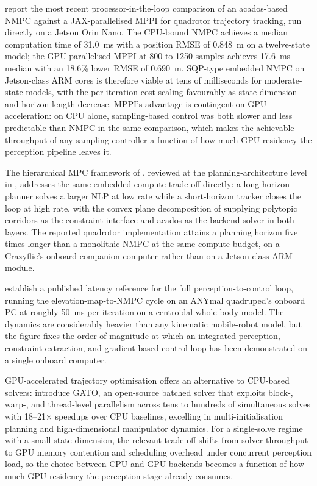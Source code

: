 \documentclass[11pt,a4paper]{article}
\begin{document}
\citet{enrico2025nmpcmppi} report the most recent processor-in-the-loop comparison of an acados-based NMPC against a JAX-parallelised MPPI for quadrotor trajectory tracking, run directly on a Jetson Orin Nano. The CPU-bound NMPC achieves a median computation time of \SI{31.0}{\milli\second} with a position RMSE of \SI{0.848}{\metre} on a twelve-state model; the GPU-parallelised MPPI at 800 to 1250 samples achieves \SI{17.6}{\milli\second} median with an 18.6\% lower RMSE of \SI{0.690}{\metre}. SQP-type embedded NMPC on Jetson-class ARM cores is therefore viable at tens of milliseconds for moderate-state models, with the per-iteration cost scaling favourably as state dimension and horizon length decrease. MPPI's advantage is contingent on GPU acceleration: on CPU alone, sampling-based control was both slower and less predictable than NMPC in the same comparison, which makes the achievable throughput of any sampling controller a function of how much GPU residency the perception pipeline leaves it.

The hierarchical MPC framework of \citet{bendersEmbeddedHierarchicalMPC2025}, reviewed at the planning-architecture level in , addresses the same embedded compute trade-off directly: a long-horizon planner solves a larger NLP at low rate while a short-horizon tracker closes the loop at high rate, with the convex plane decomposition of \citet{liu2017sfc} supplying polytopic corridors as the constraint interface and acados as the backend solver in both layers. The reported quadrotor implementation attains a planning horizon five times longer than a monolithic NMPC at the same compute budget, on a Crazyflie's onboard companion computer rather than on a Jetson-class ARM module.

\citet{grandiaPerceptiveLocomotionNonlinear2022} establish a published latency reference for the full perception-to-control loop, running the elevation-map-to-NMPC cycle on an ANYmal quadruped's onboard PC at roughly \SI{50}{\milli\second} per iteration on a centroidal whole-body model. The dynamics are considerably heavier than any kinematic mobile-robot model, but the figure fixes the order of magnitude at which an integrated perception, constraint-extraction, and gradient-based control loop has been demonstrated on a single onboard computer.

GPU-accelerated trajectory optimisation offers an alternative to CPU-based solvers: \citet{du2025gato} introduce GATO, an open-source batched solver that exploits block-, warp-, and thread-level parallelism across tens to hundreds of simultaneous solves with 18--21$\times$ speedups over CPU baselines, excelling in multi-initialisation planning and high-dimensional manipulator dynamics. For a single-solve regime with a small state dimension, the relevant trade-off shifts from solver throughput to GPU memory contention and scheduling overhead under concurrent perception load, so the choice between CPU and GPU backends becomes a function of how much GPU residency the perception stage already consumes.
\end{document}
